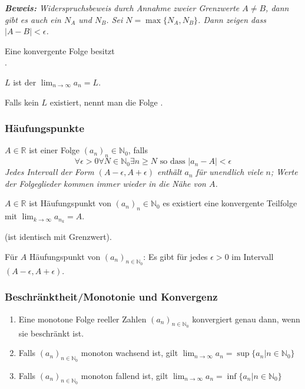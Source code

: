 \textit{\textbf{Beweis:} Widerspruchsbeweis durch Annahme zweier Grenzwerte $A \neq B$, dann gibt es auch ein $N_A$ und $N_B$. Sei $N=\max\{N_A,N_B\}$. Dann zeigen dass $|A-B|<\epsilon$.}

Eine konvergente Folge besitzt\\ .

$L$ ist der  $\lim_{n \rightarrow \infty} a_n = L$.

Falls kein $L$ existiert, nennt man die Folge .

\subsubsection{Häufungspunkte}

$A \in \mathbb{R}$ ist  einer Folge $(a_n)_n\in\mathbb{N}_0$, falls 
$$\forall \epsilon > 0 \forall N \in \mathbb{N}_0 \exists n \geq N\text{ so dass }|a_n - A | < \epsilon$$
\textit{Jedes Intervall der Form $(A- \epsilon, A+ \epsilon)$ enthält $a_n$ für unendlich viele $n$; Werte der Folgeglieder kommen immer wieder in die Nähe von $A$.}

$A\in \mathbb{R}$ ist Häufungspunkt von $(a_n)_n\in\mathbb{N}_0$ \lemma{$\Leftrightarrow$} es existiert eine konvergente Teilfolge mit $\lim_{k \rightarrow \infty} a_{n_k} = A$.

 (ist identisch mit Grenzwert).

Für $A$ Häufungspunkt von $(a_n)_{n \in \mathbb{N}_0}$: Es gibt für jedes $\epsilon>0$  im Intervall $(A-\epsilon, A + \epsilon)$.

\subsubsection{Beschränktheit/Monotonie und Konvergenz}



\begin{enumerate}
    \item Eine monotone Folge reeller Zahlen $(a_n)_{n \in \mathbb{N}_0}$ konvergiert genau dann, wenn sie beschränkt ist.
    \item Falls $(a_n)_{n \in \mathbb{N}_0}$ monoton wachsend ist, gilt $\lim_{n \rightarrow \infty} a_n = \sup\{a_n | n \in \mathbb{N}_0\}$
    \item Falls $(a_n)_{n \in \mathbb{N}_0}$ monoton fallend ist, gilt $\lim_{n \rightarrow \infty} a_n = \inf\{a_n | n \in \mathbb{N}_0\}$
\end{enumerate}

